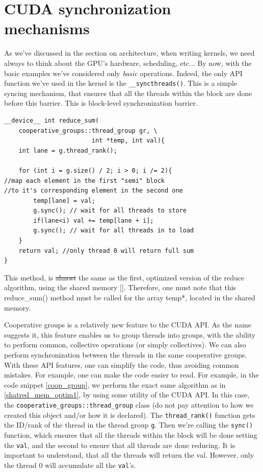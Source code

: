 
\section{CUDA synchronization mechanisms}

As we've discussed in the section on architecture, when writing kernels, we need always to think about the GPU's hardware, scheduling, etc...
By now, with the basic examples we've considered only \textit{basic} operations. Indeed, the only API function we've used in the kernel is the \verb|__syncthreads()|. 
This is a simple syncing mechanism, that ensures that all the threads within the block are 
done before this barrier. This is block-level synchronization barrier.


\begin{listing}
\begin{verbatim}
__device__ int reduce_sum(
    cooperative_groups::thread_group gr, \
                        int *temp, int val){
    int lane = g.thread_rank();

    for (int i = g.size() / 2; i > 0; i /= 2){ 
//map each element in the first "semi" block 
//to it's corresponding element in the second one
        temp[lane] = val;
        g.sync(); // wait for all threads to store
        if(lane<i) val += temp[lane + i];
        g.sync(); // wait for all threads in to load
    }
    return val; //only thread 0 will return full sum
}
\end{verbatim}
\label{coop_group}
    \caption{This method, is \sout{almost} the same as the first, optimized version of the reduce 
    algorithm, using the shared memory \autoref{}. Therefore, one must note that this reduce\_sum() method 
    must be called for the array temp*, located in the shared memory.}
\end{listing}


Cooperative groups is a relatively new feature to the CUDA API.
As the name suggests it, this feature enables us to group threads into groups, with the 
ability to perform common, collective operations (or simply collectives). We can also 
perform synchronization between the threads in the same cooperative groups. 
With these API features, one can simplify the code, thus avoiding common mistakes.
For example, one can make the code easier to read. For example, in the code snippet 
\autoref{coop_group}, we perform the exact same algorithm as in \autoref{shatred_mem_optim1},
by using some utility of the CUDA API. In this case, the \verb|cooperative_groups::thread_group|
class (do not pay attention to how we created this object and/or how it is declared).
The \verb|thread_rank()| function gets the ID/rank of the thread in the thread group \verb|g|.
Then we're calling the \verb|sync()| function, which ensures that all the threads within the
block will be done setting the \verb|val|, and the second to ensure that all threads are done reducing. It is important to understand, that all the threads will return the val. 
However, only the thread 0 will accumulate all the \verb|val|'s.\cite{blog_2020}

